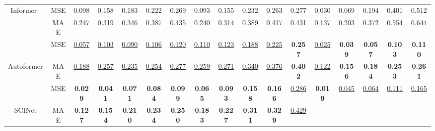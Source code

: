\documentclass{article}
\begin{document}
\begin{table*}[htbp]
{\begin{tabular}{c|c|c|c|c|c|c|c|c|c|c|c|c|c|c|c|c}
\multirow{2}{*}{Informer~\cite{Zhou2020InformerBE}}         & MSE                               & 0.098                &0.158 &0.183 & 0.222                & 0.269                &0.093 &0.155 &0.232 & 0.263                &0.277 &0.030 & 0.069                & 0.194                &0.401 &0.512 \\  
                                  & MAE                               & 0.247                &0.319 &0.346 & 0.387                & 0.435                &0.240 &0.314 &0.389 & 0.417                &0.431 &0.137 & 0.203                & 0.372                & 0.554                &0.644 \\ \hline
& MSE & {\color[RGB]{0, 100, 148} \underline{0.057}} & {\color[RGB]{0, 100, 148} \underline{0.103}} & {\color[RGB]{0, 100, 148} \underline{0.090}} & {\color[RGB]{0, 100, 148} \underline{0.106}} & {\color[RGB]{0, 100, 148} \underline{0.120}} & {\color[RGB]{0, 100, 148} \underline{0.110}} & {\color[RGB]{0, 100, 148} \underline{0.123}} & {\color[RGB]{0, 100, 148} \underline{0.188}} & {\color[RGB]{0, 100, 148} \underline{0.225}} & \textbf{0.257} & {\color[RGB]{0, 100, 148} \underline{0.025}} & \textbf{0.039} & \textbf{0.057} & \textbf{0.103} & \textbf{0.110} \\
\multirow{-2}{*}{Autoformer~\cite{Wu2021AutoformerDT}} & MAE & {\color[RGB]{0, 100, 148} \underline{0.188}} & {\color[RGB]{0, 100, 148} \underline{0.257}} & {\color[RGB]{0, 100, 148} \underline{0.235}} & {\color[RGB]{0, 100, 148} \underline{0.254}} & {\color[RGB]{0, 100, 148} \underline{0.277}} & {\color[RGB]{0, 100, 148} \underline{0.259}} & {\color[RGB]{0, 100, 148} \underline{0.271}} & {\color[RGB]{0, 100, 148} \underline{0.340}} & {\color[RGB]{0, 100, 148} \underline{0.376}} & \textbf{0.402} & {\color[RGB]{0, 100, 148} \underline{0.122}} & \textbf{0.156} & \textbf{0.184} & \textbf{0.253} & \textbf{0.261} \\ \hline
 & MSE & \textbf{0.029} & \textbf{0.041} & \textbf{0.071} & \textbf{0.084} & \textbf{0.099} & 
 \textbf{0.065} & \textbf{0.093} & \textbf{0.158} & \textbf{0.166} & {\color[RGB]{0, 100, 148} \underline{0.286}} &
 \textbf{0.019} & {\color[RGB]{0, 100, 148} \underline{0.045}} & {\color[RGB]{0, 100, 148} \underline{0.064}} & {\color[RGB]{0, 100, 148} \underline{0.111}} & {\color[RGB]{0, 100, 148} \underline{0.165}} \\
\multirow{-2}{*}{SCINet} & MAE & \textbf{0.127} & \textbf{0.154} & \textbf{0.210} & \textbf{0.234} & \textbf{0.250} & 
\textbf{0.183} & \textbf{0.227} & \textbf{0.311} & \textbf{0.329} & {\color[RGB]{0, 100, 148} \underline{0.429}} &

\end{tabular}}
\end{table*}
\end{document}
